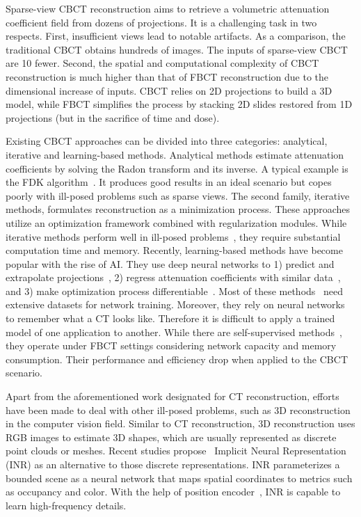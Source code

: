 \documentclass[runningheads]{llncs}
\begin{document}
Sparse-view CBCT reconstruction aims to retrieve a volumetric attenuation coefficient field from dozens of projections. It is a challenging task in two respects. First, insufficient views lead to notable artifacts. As a comparison, the traditional CBCT obtains hundreds of images. The inputs of sparse-view CBCT are 10 fewer. Second, the spatial and computational complexity of CBCT reconstruction is much higher than that of FBCT reconstruction due to the dimensional increase of inputs. CBCT relies on 2D projections to build a 3D model, while FBCT simplifies the process by stacking 2D slides restored from 1D projections (but in the sacrifice of time and dose).

Existing CBCT approaches can be divided into three categories: analytical, iterative and learning-based methods. Analytical methods estimate attenuation coefficients by solving the Radon transform and its inverse. A typical example is the FDK algorithm~\cite{feldkamp1984practical}. It produces good results in an ideal scenario but copes poorly with ill-posed problems such as sparse views. The second family, iterative methods, formulates reconstruction as a minimization process. These approaches utilize an optimization framework combined with regularization modules. While iterative methods perform well in ill-posed problems~\cite{andersen1984simultaneous,sidky2008image}, they require substantial computation time and memory. Recently, learning-based methods have become popular with the rise of AI. They use deep neural networks to 1) predict and extrapolate projections~\cite{anirudh2018lose,tang2019projection,wang2021improving,zang2021intratomo}, 2) regress attenuation coefficients with similar data~\cite{kasten2020end,ying2019x2ct}, and 3) make optimization process differentiable~\cite{adler2018learned,chen2017learned,kang2018deep}. Most of these methods~\cite{anirudh2018lose,kasten2020end,tang2019projection,ying2019x2ct} need extensive datasets for network training. Moreover, they rely on neural networks to remember what a CT looks like. Therefore it is difficult to apply a trained model of one application to another. While there are self-supervised methods~\cite{adler2018learned,zang2021intratomo}, they operate under FBCT settings considering network capacity and memory consumption. Their performance and efficiency drop when applied to the CBCT scenario.


Apart from the aforementioned work designated for CT reconstruction, efforts have been made to deal with other ill-posed problems, such as 3D reconstruction in the computer vision field. Similar to CT reconstruction, 3D reconstruction uses RGB images to estimate 3D shapes, which are usually represented as discrete point clouds or meshes. Recent studies propose~\cite{mildenhall2020nerf,park2019deepsdf} Implicit Neural Representation (INR) as an alternative to those discrete representations. INR parameterizes a bounded scene as a neural network that maps spatial coordinates to metrics such as occupancy and color. With the help of position encoder~\cite{mueller2022instant,tancik2020fourier}, INR is capable to learn high-frequency details.
\end{document}
